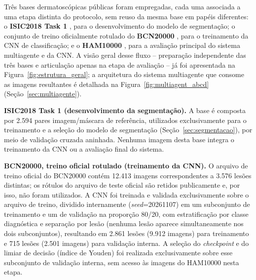 Três bases dermatoscópicas públicas foram empregadas, cada uma associada a uma etapa distinta do protocolo, sem reuso da mesma base em papéis diferentes: o \textbf{ISIC2018 Task 1} \cite{codella2018isic}, para o desenvolvimento do modelo de segmentação; o conjunto de treino oficialmente rotulado do \textbf{BCN20000} \cite{combalia2019bcn20000}, para o treinamento da CNN de classificação; e o \textbf{HAM10000} \cite{tschandl2018ham10000}, para a avaliação principal do sistema multiagente e da CNN. A visão geral desse fluxo -- preparação independente das três bases e articulação apenas na etapa de avaliação -- já foi apresentada na Figura~\ref{fig:estrutura_geral}; a arquitetura do sistema multiagente que consome as imagens resultantes é detalhada na Figura~\ref{fig:multiagent_abcd} (Seção~\ref{sec:multiagente}).

\textbf{ISIC2018 Task 1 (desenvolvimento da segmentação).} A base é composta por 2.594 pares imagem/máscara de referência, utilizados exclusivamente para o treinamento e a seleção do modelo de segmentação (Seção~\ref{sec:segmentacao}), por meio de validação cruzada aninhada. Nenhuma imagem desta base integra o treinamento da CNN ou a avaliação final do sistema.

\textbf{BCN20000, treino oficial rotulado (treinamento da CNN).} O arquivo de treino oficial do BCN20000 contém 12.413 imagens correspondentes a 3.576 lesões distintas; os rótulos do arquivo de teste oficial são retidos publicamente e, por isso, não foram utilizados. A CNN foi treinada e validada exclusivamente sobre o arquivo de treino, dividido internamente (\textit{seed}=20261107) em um subconjunto de treinamento e um de validação na proporção 80/20, com estratificação por classe diagnóstica e separação por lesão (nenhuma lesão aparece simultaneamente nos dois subconjuntos), resultando em 2.861 lesões (9.912 imagens) para treinamento e 715 lesões (2.501 imagens) para validação interna. A seleção do \textit{checkpoint} e do limiar de decisão (índice de Youden) foi realizada exclusivamente sobre esse subconjunto de validação interna, sem acesso às imagens do HAM10000 nesta etapa.

